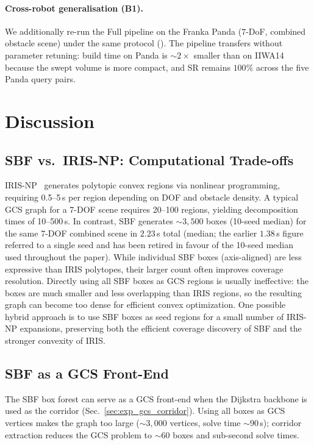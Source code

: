 \documentclass[journal]{IEEEtran}
\begin{document}
\paragraph{Cross-robot generalisation (B1).}
We additionally re-run the Full pipeline on the Franka Panda
($7$-DoF, combined obstacle scene) under the same protocol
(). The pipeline transfers without
parameter retuning: build time on Panda is $\sim 2{\times}$
smaller than on IIWA14 because the swept volume is more
compact, and SR remains $100\%$ across the five Panda query
pairs.


\section{Discussion}\label{sec:discussion}

\subsection{SBF vs.\ IRIS-NP: Computational Trade-offs}

IRIS-NP~\cite{werner2024fast} generates polytopic convex regions via
nonlinear programming, requiring 0.5--5\,s per region depending on DOF
and obstacle density.
A typical GCS graph for a 7-DOF scene requires 20--100 regions,
yielding decomposition times of 10--500\,s.
In contrast, SBF generates ${\sim}3{,}500$ boxes (10-seed median) for
the same 7-DOF combined scene in $2.23$\,s total (median; the earlier
$1.38$\,s figure referred to a single seed and has been retired in
favour of the 10-seed median used throughout the paper).
While individual SBF boxes (axis-aligned) are less expressive than
IRIS polytopes, their larger count often improves coverage resolution.
Directly using all SBF boxes as GCS regions is usually ineffective:
the boxes are much smaller and less overlapping than IRIS regions,
so the resulting graph can become too dense for efficient convex
optimization.
One possible hybrid approach is to use SBF boxes as seed regions
for a small number of IRIS-NP expansions, preserving both the
efficient coverage discovery of SBF and the stronger convexity of IRIS.

\subsection{SBF as a GCS Front-End}

The SBF box forest can serve as a GCS front-end when the
Dijkstra backbone is used as the corridor (Sec.~\ref{sec:exp_gcs_corridor}).
Using all boxes as GCS vertices makes the graph too large
(${\sim}3{,}000$ vertices, solve time ${\sim}90$\,s);
corridor extraction reduces the GCS problem to ${\sim}60$ boxes
and sub-second solve times.
\end{document}
